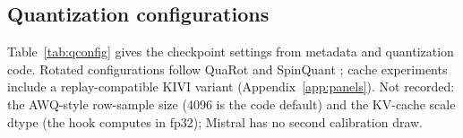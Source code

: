 \subsection{Quantization configurations}
\label{app:qconfig}

Table~\ref{tab:qconfig} gives the checkpoint settings from metadata and quantization code. Rotated configurations follow QuaRot \citep{ashkboos2024quarot} and SpinQuant \citep{liu2025spinquant}; cache experiments include a replay-compatible KIVI variant \citep{liu2024kivi} (Appendix~\ref{app:panels}). Not recorded: the AWQ-style row-sample size (4096 is the code default) and the KV-cache scale dtype (the hook computes in fp32); Mistral has no second calibration draw. %

